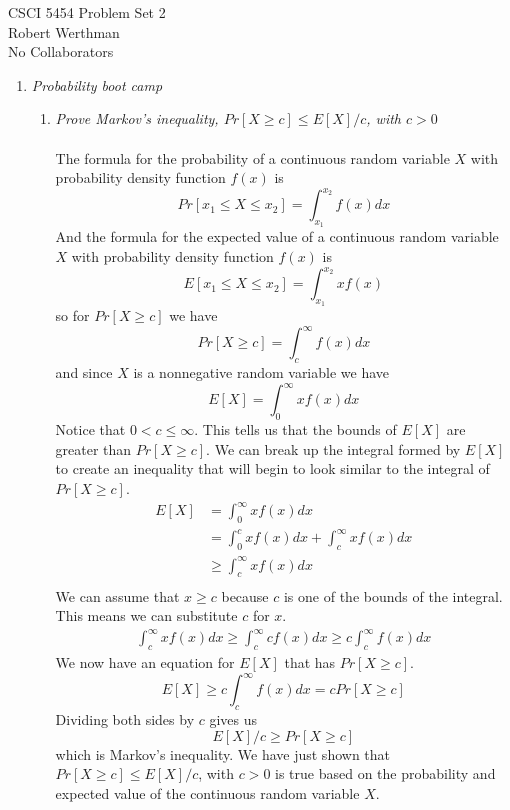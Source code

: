 \documentclass[12pt]{article}
\begin{document}
CSCI 5454 \hfill Problem Set 2\\
Robert Werthman\\
No Collaborators

\hrulefill

\begin{enumerate}

	\item \textit{Probability boot camp}
	
	\begin{enumerate}
	
		\item \textit{Prove Markov's inequality, $Pr[X \ge c] \le E[X]/c$, with $c>0$}\\
		\\
		The formula for the probability of a continuous random variable $X$ with probability density function $f(x)$ is
			$$
			Pr[x_1 \le X \le x_2] = \int_{x_1}^{x_2} f(x)dx
			$$	
		And the formula for the expected value of a continuous random variable $X$ with probability density function $f(x)$ is
			$$
			E[x_1 \le X \le x_2] = \int_{x_1}^{x_2} xf(x)
			$$	
		so for $Pr[X \ge c]$ we have
			$$
			Pr[X \ge c] = \int_{c}^{\infty} f(x)dx
			$$
		and since $X$ is a nonnegative random variable we have
			$$
			E[X] = \int_{0}^{\infty} xf(x)dx
			$$
		Notice that $0 < c \le \infty$.  This tells us that the bounds of $E[X]$ are greater than $Pr[X \ge c]$.  We can break up the integral formed by $E[X]$ to create an inequality that 
		will begin to look similar to the integral of $Pr[X \ge c]$.
			\begin{align*}
				E[X] &= \int_{0}^{\infty} xf(x)dx\\
				&= \int_{0}^{c} xf(x)dx + \int_{c}^{\infty} xf(x)dx\\
				&\ge \int_{c}^{\infty} xf(x)dx\\
			\end{align*}
		We can assume that $x \ge c$ because $c$ is one of the bounds of the integral.  This means we can substitute $c$ for $x$.
			\begin{align*}
				 \int_{c}^{\infty} xf(x)dx \ge \int_{c}^{\infty} cf(x)dx \ge c\int_{c}^{\infty} f(x)dx
			\end{align*}
		We now have an equation for $E[X]$ that has $Pr[X \ge c]$.
			$$
			E[X] \ge c\int_{c}^{\infty} f(x)dx = cPr[X \ge c]
			$$
		Dividing both sides by $c$ gives us
			$$
			E[X]/c \ge Pr[X \ge c]
			$$
		which is Markov's inequality.  We have just shown that $Pr[X \ge c] \le E[X]/c$, with $c>0$ is true based on the probability and expected value of the continuous random variable $X$.
		

\end{enumerate}
\end{enumerate}
\end{document}
